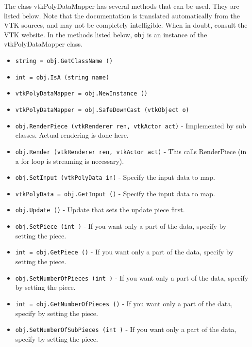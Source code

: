 The class vtkPolyDataMapper has several methods that can be used.
  They are listed below.
Note that the documentation is translated automatically from the VTK sources,
and may not be completely intelligible.  When in doubt, consult the VTK website.
In the methods listed below, \verb|obj| is an instance of the vtkPolyDataMapper class.
\begin{itemize}
\item  \verb|string = obj.GetClassName ()|

\item  \verb|int = obj.IsA (string name)|

\item  \verb|vtkPolyDataMapper = obj.NewInstance ()|

\item  \verb|vtkPolyDataMapper = obj.SafeDownCast (vtkObject o)|

\item  \verb|obj.RenderPiece (vtkRenderer ren, vtkActor act)| -  Implemented by sub classes. Actual rendering is done here.

\item  \verb|obj.Render (vtkRenderer ren, vtkActor act)| -  This calls RenderPiece (in a for loop is streaming is necessary).

\item  \verb|obj.SetInput (vtkPolyData in)| -  Specify the input data to map.

\item  \verb|vtkPolyData = obj.GetInput ()| -  Specify the input data to map.

\item  \verb|obj.Update ()| -  Update that sets the update piece first.

\item  \verb|obj.SetPiece (int )| -  If you want only a part of the data, specify by setting the piece.

\item  \verb|int = obj.GetPiece ()| -  If you want only a part of the data, specify by setting the piece.

\item  \verb|obj.SetNumberOfPieces (int )| -  If you want only a part of the data, specify by setting the piece.

\item  \verb|int = obj.GetNumberOfPieces ()| -  If you want only a part of the data, specify by setting the piece.

\item  \verb|obj.SetNumberOfSubPieces (int )| -  If you want only a part of the data, specify by setting the piece.


\end{itemize}

